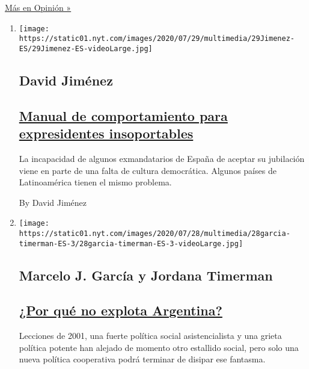 \href{/es/section/opinion}{Más en Opinión »}

\begin{enumerate}
\def\labelenumi{\arabic{enumi}.}
\item
  \texttt{[image: https://static01.nyt.com/images/2020/07/29/multimedia/29Jimenez-ES/29Jimenez-ES-videoLarge.jpg]}

  \hypertarget{david-jimuxe9nez}{%
  \subsection{David Jiménez}\label{david-jimuxe9nez}}

  \hypertarget{manual-de-comportamiento-para-expresidentes-insoportables}{%
  \subsection{\texorpdfstring{\href{/es/2020/07/29/espanol/opinion/espana-felipe-gonzalez-jose-maria-aznar.html}{Manual
  de comportamiento para expresidentes
  insoportables}}{Manual de comportamiento para expresidentes insoportables}}\label{manual-de-comportamiento-para-expresidentes-insoportables}}

  La incapacidad de algunos exmandatarios de España de aceptar su
  jubilación viene en parte de una falta de cultura democrática. Algunos
  países de Latinoamérica tienen el mismo problema.

  By David Jiménez
\item
  \texttt{[image: https://static01.nyt.com/images/2020/07/28/multimedia/28garcia-timerman-ES-3/28garcia-timerman-ES-3-videoLarge.jpg]}

  \hypertarget{marcelo-j-garcuxeda-y-jordana-timerman}{%
  \subsection{Marcelo J. García y Jordana
  Timerman}\label{marcelo-j-garcuxeda-y-jordana-timerman}}

  \hypertarget{por-quuxe9-no-explota-argentina}{%
  \subsection{\texorpdfstring{\href{/es/2020/07/28/espanol/opinion/argentina-estallido-2001-coronavirus.html}{¿Por
  qué no explota
  Argentina?}}{¿Por qué no explota Argentina?}}\label{por-quuxe9-no-explota-argentina}}

  Lecciones de 2001, una fuerte política social asistencialista y una
  grieta política potente han alejado de momento otro estallido social,
  pero solo una nueva política cooperativa podrá terminar de disipar ese
  fantasma.


\end{enumerate}
